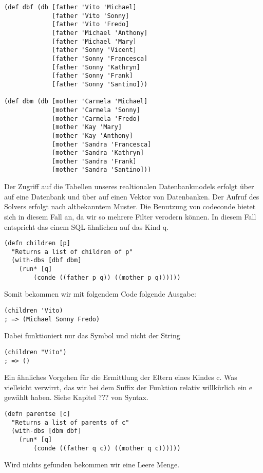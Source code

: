 \begin{lstlisting}
(def dbf (db [father 'Vito 'Michael]
             [father 'Vito 'Sonny]
             [father 'Vito 'Fredo]
             [father 'Michael 'Anthony]
             [father 'Michael 'Mary]
             [father 'Sonny 'Vicent]
             [father 'Sonny 'Francesca]
             [father 'Sonny 'Kathryn]
             [father 'Sonny 'Frank]
             [father 'Sonny 'Santino]))
 
(def dbm (db [mother 'Carmela 'Michael]
             [mother 'Carmela 'Sonny]
             [mother 'Carmela 'Fredo]
             [mother 'Kay 'Mary]
             [mother 'Kay 'Anthony]
             [mother 'Sandra 'Francesca]
             [mother 'Sandra 'Kathryn]
             [mother 'Sandra 'Frank]
             [mother 'Sandra 'Santino]))
\end{lstlisting}
Der Zugriff auf die Tabellen unseres realtionalen Datenbankmodels erfolgt über  auf eine Datenbank und über  auf einen Vektor von Datenbanken. Der Aufruf des Solvers erfolgt nach altbekanntem Muster. Die Benutzung von code{conde} bietet sich in diesem Fall an, da wir so mehrere Filter verodern können. In diesem Fall entspricht das einem SQL-ähnlichen  auf das Kind q.

\begin{lstlisting}
(defn children [p] 
  "Returns a list of children of p"
  (with-dbs [dbf dbm] 
	(run* [q] 
		(conde ((father p q)) ((mother p q))))))
\end{lstlisting}
Somit bekommen wir mit folgendem Code folgende Ausgabe:

\begin{lstlisting}
(children 'Vito)
; => (Michael Sonny Fredo)
\end{lstlisting}
Dabei funktioniert nur das Symbol  und nicht der String 

\begin{lstlisting}
(children "Vito")
; => ()
\end{lstlisting}
Ein ähnliches Vorgehen für die Ermittlung der Eltern eines Kindes \dq{}c\dq{}. Was vielleicht verwirrt, das wir bei dem Suffix der Funktion relativ willkürlich ein e gewählt haben. Siehe Kapitel ??? von Syntax.

\begin{lstlisting}
(defn parentse [c] 
  "Returns a list of parents of c"
  (with-dbs [dbm dbf] 
	(run* [q] 
		(conde ((father q c)) ((mother q c))))))
\end{lstlisting}
Wird nichts gefunden bekommen wir eine Leere Menge.

